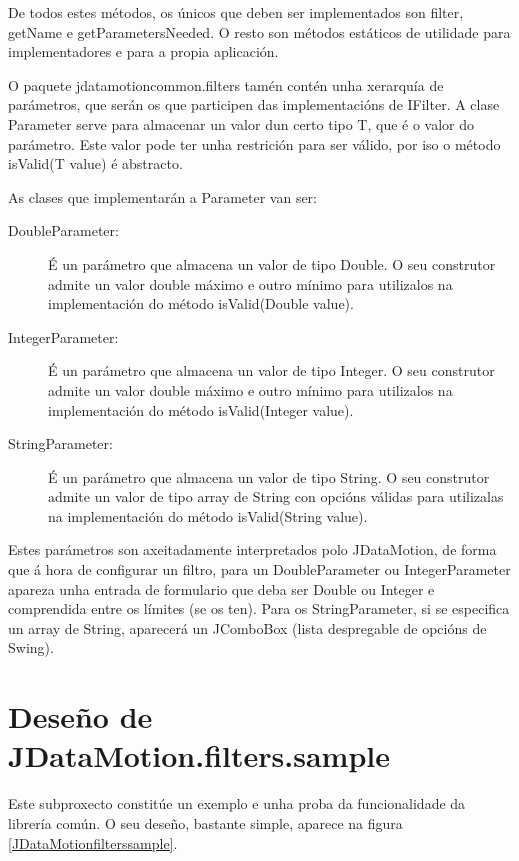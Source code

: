 De todos estes métodos, os únicos que deben ser implementados son filter, getName e getParametersNeeded. O resto son métodos estáticos de utilidade para implementadores e para a propia aplicación.

O paquete jdatamotioncommon.filters tamén contén unha xerarquía de parámetros, que serán os que participen das implementacións de IFilter. A clase Parameter serve para almacenar un valor dun certo tipo T, que é o valor do parámetro. Este valor pode ter unha restrición para ser válido, por iso o método isValid(T value) é abstracto.

As clases que implementarán a Parameter van ser:

\begin{description}
\item[DoubleParameter:] \hfill
É un parámetro que almacena un valor de tipo Double. O seu construtor admite un valor double máximo e outro mínimo para utilizalos na implementación do método isValid(Double value).
\item[IntegerParameter:] \hfill
É un parámetro que almacena un valor de tipo Integer. O seu construtor admite un valor double máximo e outro mínimo para utilizalos na implementación do método isValid(Integer value).
\item[StringParameter:] \hfill
É un parámetro que almacena un valor de tipo String. O seu construtor admite un valor de tipo array de String con opcións válidas para utilizalas na implementación do método isValid(String value).
\end{description}

Estes parámetros son axeitadamente interpretados polo JDataMotion, de forma que á hora de configurar un filtro, para un DoubleParameter ou IntegerParameter apareza unha entrada de formulario que deba ser Double ou Integer e comprendida entre os límites (se os ten). Para os StringParameter, si se especifica un array de String, aparecerá un JComboBox (lista despregable de opcións de Swing).

\section{Deseño de JDataMotion.filters.sample}

Este subproxecto constitúe un exemplo e unha proba da funcionalidade da librería común. O seu deseño, bastante simple, aparece na figura \ref{JDataMotionfilterssample}.

